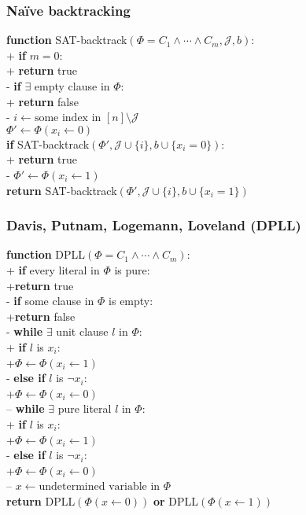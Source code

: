 \documentclass{article}
\begin{document}
\subsubsection{Na\"ive backtracking}

\begin{pseudo}
\textbf{function} \textsf{SAT-backtrack}$(\Phi=C_1\wedge\cdots\wedge C_m, \mathcal{J}, b)$:\\+
	\textbf{if} $m=0$:\\+ \textbf{return} \textsf{true}\\-
	\textbf{if} $\exists$ empty clause in $\Phi$:\\+
		\textbf{return} \textsf{false}\\-
    $i\leftarrow\text{some index in $[n]\setminus\mathcal{J}$}$\\
	$\Phi'\leftarrow\Phi(x_i\leftarrow 0)$\\
	\textbf{if} \textsf{SAT-backtrack}$(\Phi', \mathcal{J}\cup\{i\}, b\cup\{x_i=0\})$:\\+
		\textbf{return} \textsf{true}\\-
	$\Phi'\leftarrow\Phi(x_i\leftarrow 1)$\\
	\textbf{return} \textsf{SAT-backtrack}$(\Phi',\mathcal{J}\cup\{i\}, b\cup\{x_i=1\})$
\end{pseudo}

\subsubsection{Davis, Putnam, Logemann, Loveland (DPLL)}

\begin{pseudo}
\textbf{function} \textsf{DPLL}$(\Phi=C_1\wedge\cdots\wedge C_m)$:\\+
	\textbf{if} every literal in $\Phi$ is pure:\\+\textbf{return} \textsf{true}\\-
	\textbf{if} some clause in $\Phi$ is empty:\\+\textbf{return} \textsf{false}\\-
	\textbf{while} $\exists$ unit clause $l$ in $\Phi$:\\+
		\textbf{if} $l$ is $x_i$:\\+$\Phi\leftarrow\Phi(x_i\leftarrow 1)$\\-
		\textbf{else if} $l$ is $\neg x_i$:\\+$\Phi\leftarrow\Phi(x_i\leftarrow 0)$\\--
	\textbf{while} $\exists$ pure literal $l$ in $\Phi$:\\+
		\textbf{if} $l$ is $x_i$:\\+$\Phi\leftarrow\Phi(x_i\leftarrow 1)$\\-
		\textbf{else if} $l$ is $\neg x_i$:\\+$\Phi\leftarrow\Phi(x_i\leftarrow 0)$\\--
    $x\leftarrow\text{undetermined variable in }\Phi$\\
	\textbf{return} \textsf{DPLL}$(\Phi(x\leftarrow 0))$ 
	\textbf{or}     \textsf{DPLL}$(\Phi(x\leftarrow 1))$
\end{pseudo}
\end{document}
